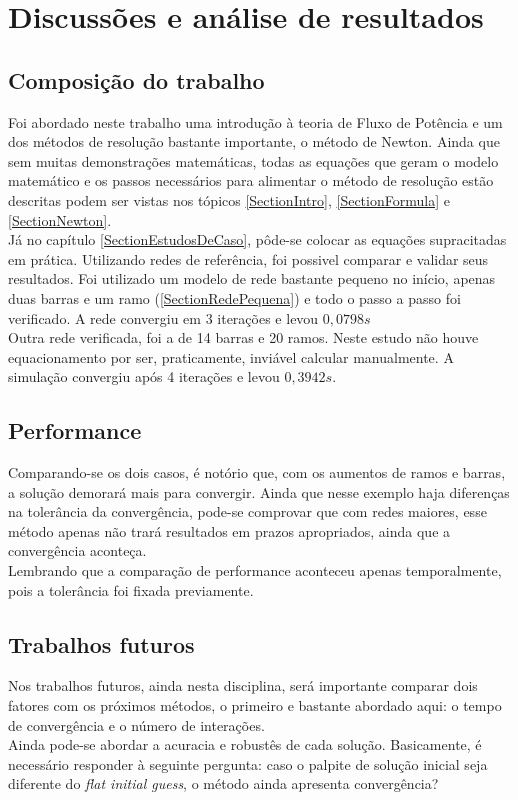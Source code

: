 \chapter{Discussões e an\'alise de resultados}
\section{Composição do trabalho}
Foi abordado neste trabalho uma introdução à teoria de Fluxo de Potência e um dos métodos de resolução bastante importante, o método de Newton. Ainda que sem muitas demonstrações matemáticas, todas as equações que geram o modelo matemático e os passos necessários para alimentar o método de resolução estão descritas podem ser vistas nos tópicos \ref{SectionIntro}, \ref{SectionFormula} e \ref{SectionNewton}.\\
Já no capítulo \ref{SectionEstudosDeCaso}, pôde-se colocar as equações supracitadas em prática. Utilizando redes de referência, foi possivel comparar e validar seus resultados. Foi utilizado um modelo de rede bastante pequeno no início, apenas duas barras e um ramo (\ref{SectionRedePequena}) e todo o passo a passo foi verificado. A rede convergiu em 3 iterações e levou $0,0798s$\\
Outra rede verificada, foi a de 14 barras e 20 ramos. Neste estudo não houve equacionamento por ser, praticamente, inviável calcular manualmente. A simulação convergiu após 4 iterações e levou $0,3942s$.\\
\section{Performance}
Comparando-se os dois casos, é notório que, com os aumentos de ramos e barras, a solução demorará mais para convergir. Ainda que nesse exemplo haja diferenças na tolerância da convergência, pode-se comprovar que com redes maiores, esse método apenas não trará resultados em prazos apropriados, ainda que a convergência aconteça.\\
Lembrando que a comparação de performance aconteceu apenas temporalmente, pois a tolerância foi fixada previamente.
\section{Trabalhos futuros}
Nos trabalhos futuros, ainda nesta disciplina, será importante comparar dois fatores com os próximos métodos, o primeiro e bastante abordado aqui: o tempo de convergência e o número de interações.\\
Ainda pode-se abordar a acuracia e robustês de cada solução. Basicamente, é necessário responder à seguinte pergunta: caso o palpite de solução inicial seja diferente do \textit{flat initial guess}, o método ainda apresenta convergência? 




